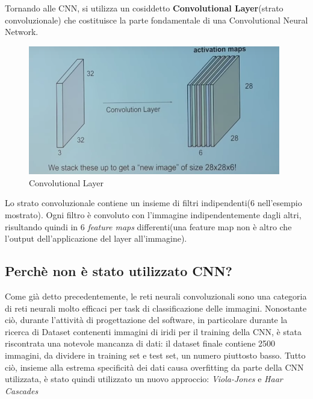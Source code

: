 \newpage
Tornando alle CNN, si utilizza un cosiddetto \textbf{Convolutional Layer}(strato convoluzionale) che costituisce la parte fondamentale di una Convolutional Neural Network.
\begin{figure}[h!]
	\centering
	\includegraphics[width=110mm]{img/3/cnn_1_4}
	\caption{\fontsize{10px}{0mm}\selectfont Convolutional Layer \label{fig:cnn_1_4}}
\end{figure}
\newline
Lo strato convoluzionale contiene un insieme di filtri indipendenti(6 nell'esempio mostrato). Ogni filtro è convoluto con l'immagine indipendentemente dagli altri, risultando quindi in 6 \textit{feature maps} differenti(una feature map non è altro che l'output dell'applicazione del layer all'immagine).\cite{MediumCNN}

\subsection{Perchè non è stato utilizzato CNN?}\label{considerazioniCNN}
Come già detto precedentemente, le reti neurali convoluzionali sono una categoria di reti neurali molto efficaci per task di classificazione delle immagini. Nonostante ciò, durante l'attività di progettazione del software, in particolare durante la ricerca di Dataset contenenti immagini di iridi per il training della CNN, è stata riscontrata una notevole mancanza di dati: il dataset finale contiene 2500 immagini, da dividere in training set e test set, un numero piuttosto basso.
Tutto ciò, insieme alla estrema specificità dei dati causa overfitting da parte della CNN utilizzata, è stato quindi utilizzato un nuovo approccio: \emph{Viola-Jones} e \emph{Haar Cascades}
\newpage